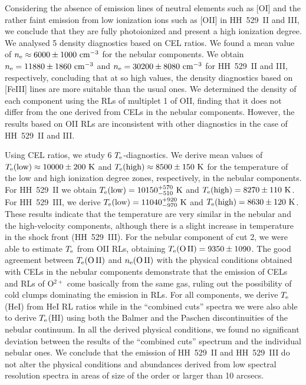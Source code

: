 \documentclass[fleqn,usenatbib]{mnras}
\begin{document}
Considering the absence of emission lines of neutral elements such as [O\thinspace I] and the rather faint emission from low ionization ions such as [O\thinspace II] in HH~529~II and III, we conclude that they are fully photoionized and present a high ionization degree. We analysed 5 density diagnostics based on CEL ratios. We found a mean value of $n_{\rm e}\approx 6000 \pm 1000 \text{ cm}^{-3}$ for the nebular components. We obtain $n_{\rm e}=11880 \pm 1860 \text{ cm}^{-3}$ and $n_{\rm e}=30200 \pm 8080 \text{ cm}^{-3}$ for HH~529~II and III, respectively, concluding that at so high values, the density diagnostics based on [Fe\thinspace III] lines are more suitable than the usual ones. We determined the density of each component using the RLs of multiplet 1 of O\thinspace II, finding that it does not differ from the one derived from CELs in the nebular components. However, the results based on O\thinspace II RLs are inconsistent with other diagnostics in the case of HH~529~II and III.

Using CEL ratios, we study 6 $T_{\rm e}$-diagnostics. We derive mean values of $T_{\rm e}\text{(low)}\approx 10000 \pm 200 \text{ K}$ and $T_{\rm e}\text{(high)}\approx 8500 \pm 150 \text{ K}$ for the temperature of the low and high ionization degree zones, respectively, in the nebular components. For HH~529~II we obtain $T_{\rm e}\text{(low)}= 10150^{+570} _{-510}\text{ K}$ and $T_{\rm e}\text{(high)}= 8270\pm 110\text{ K}$. For HH~529~III, we derive $T_{\rm e}\text{(low)}= 11040^{+920} _{-970}\text{ K}$ and $T_{\rm e}\text{(high)}= 8630 \pm 120\text{ K}$. These results indicate that the temperature are very similar in the nebular and the high-velocity components, although there is a slight increase in temperature in the shock front (HH~529~III). For the nebular component of cut 2, we were able to estimate $T_{\rm e}$ from O\thinspace II RLs, obtaining  $T_{\rm e}(\text{O}\thinspace \text{II})=9350 \pm 1090$. The good agreement between $T_{\rm e}(\text{O}\thinspace \text{II})$ and $n_{\rm e}(\text{O}\thinspace \text{II})$ with the physical conditions obtained with CELs in the nebular components demonstrate that the emission of CELs and RLs of O$^{2+}$ come basically from the same gas, ruling out the possibility of cold clumps dominating the emission in RLs. For all components, we derive $T_{\rm e}$(He\thinspace I) from He\thinspace I RL ratios while in the ``combined cuts'' spectra we were also able to derive $T_{\rm e}$(H\thinspace I) using both the Balmer and the Paschen discontinuities of the nebular continuum. In all the derived physical conditions, we found no significant deviation between the results of the ``combined cuts'' spectrum and the individual nebular ones. We conclude that the emission of HH~529~II and HH~529~III do not alter the physical conditions and abundances derived from low spectral resolution spectra in areas of size of the order or larger than 10 arcsecs. 
\end{document}
